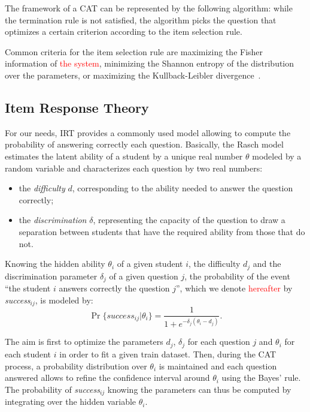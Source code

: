 \documentclass{sig-alternate}
\newcommand\alert[1]{\textcolor{red}{#1}}
\begin{document}
The framework of a CAT can be represented by the following algorithm: while the termination rule is not satisfied, the algorithm picks the question that optimizes a certain criterion according to the item selection rule.

Common criteria for the item selection rule are maximizing the Fisher information of \alert{the system}, minimizing the Shannon entropy of the distribution over the parameters, or maximizing the Kullback-Leibler divergence~\cite{Xu2003}. %

\subsection{Item Response Theory}

For our needs, IRT provides a commonly used model allowing to compute the probability of answering correctly each question. Basically, the Rasch model estimates the latent ability of a student by a unique real number $\theta$ modeled by a random variable and characterizes each question by two real numbers:

\begin{itemize}
\item the \emph{difficulty} $d$, corresponding to the ability needed to answer the question correctly;
\item the \emph{discrimination} $\delta$, representing the capacity of the question to draw a separation between students that have the required ability from those that do not.
\end{itemize}

Knowing the hidden ability $\theta_i$ of a given student $i$, the difficulty $d_j$ and the discrimination parameter $\delta_j$ of a given question $j$, the probability of the event ``the student $i$ answers correctly the question $j$'', which we denote \alert{hereafter} by \emph{success}$_{ij}$, is modeled by:
\[ \Pr\{success_{ij}|\theta_i\} = \frac1{1+e^{-\delta_j(\theta_i - d_j)}}. \]

The aim is first to optimize the parameters $d_j$, $\delta_j$ for each question $j$ and $\theta_i$ for each student $i$ in order to fit a given train dataset. Then, during the CAT process, a probability distribution over $\theta_i$ is maintained and each question answered allows to refine the confidence interval around $\theta_i$ using the Bayes' rule. The probability of \emph{success}$_{ij}$ knowing the parameters can thus be computed by integrating over the hidden variable $\theta_i$.
\end{document}
